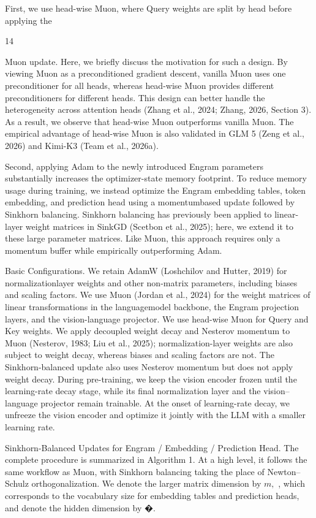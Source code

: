 \documentclass[
  10
]{article}
\begin{document}
First, we use head-wise Muon, where Query weights are split by head
before applying the

14

Muon update. Here, we briefly discuss the motivation for such a design.
By viewing Muon as a preconditioned gradient descent, vanilla Muon uses
one preconditioner for all heads, whereas head-wise Muon provides
different preconditioners for different heads. This design can better
handle the heterogeneity across attention heads (Zhang et al., 2024;
Zhang, 2026, Section 3). As a result, we observe that head-wise Muon
outperforms vanilla Muon. The empirical advantage of head-wise Muon is
also validated in GLM 5 (Zeng et al., 2026) and Kimi-K3 (Team et al.,
2026a).

Second, applying Adam to the newly introduced Engram parameters
substantially increases the optimizer-state memory footprint. To reduce
memory usage during training, we instead optimize the Engram embedding
tables, token embedding, and prediction head using a momentumbased
update followed by Sinkhorn balancing. Sinkhorn balancing has previously
been applied to linear-layer weight matrices in SinkGD (Scetbon et al.,
2025); here, we extend it to these large parameter matrices. Like Muon,
this approach requires only a momentum buffer while empirically
outperforming Adam.

Basic Configurations. We retain AdamW (Loshchilov and Hutter, 2019) for
normalizationlayer weights and other non-matrix parameters, including
biases and scaling factors. We use Muon (Jordan et al., 2024) for the
weight matrices of linear transformations in the languagemodel backbone,
the Engram projection layers, and the vision-language projector. We use
head-wise Muon for Query and Key weights. We apply decoupled weight
decay and Nesterov momentum to Muon (Nesterov, 1983; Liu et al., 2025);
normalization-layer weights are also subject to weight decay, whereas
biases and scaling factors are not. The Sinkhorn-balanced update also
uses Nesterov momentum but does not apply weight decay. During
pre-training, we keep the vision encoder frozen until the learning-rate
decay stage, while its final normalization layer and the
vision--language projector remain trainable. At the onset of
learning-rate decay, we unfreeze the vision encoder and optimize it
jointly with the LLM with a smaller learning rate.

Sinkhorn-Balanced Updates for Engram / Embedding / Prediction Head. The
complete procedure is summarized in Algorithm 1. At a high level, it
follows the same workflow as Muon, with Sinkhorn balancing taking the
place of Newton--Schulz orthogonalization. We denote the larger matrix
dimension by \(m ,\) , which corresponds to the vocabulary size for
embedding tables and prediction heads, and denote the hidden dimension
by �.
\end{document}
